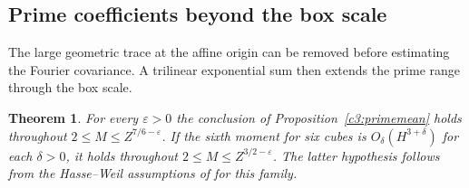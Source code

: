 \documentclass[11pt,letterpaper]{article}
\newtheorem{theorem}{Theorem}[section]
\theoremstyle{definition}
\begin{document}
\subsection{Prime coefficients beyond the box scale}
The large geometric trace at the affine origin can be removed before
estimating the Fourier covariance. A trilinear exponential sum then
extends the prime range through the box scale.
\begin{theorem}\label{c3:longprimemean}
For every $\varepsilon>0$ the conclusion of
Proposition~\ref{c3:primemean} holds throughout
$2\le M\le Z^{7/6-\varepsilon}$. If the sixth moment for six
cubes is $O_\delta(H^{3+\delta})$ for each $\delta>0$, it holds
throughout $2\le M\le Z^{3/2-\varepsilon}$. The latter hypothesis
follows from the Hasse--Weil assumptions of
\cite[Theorem 1.4]{c3:wang} for this family.
\end{theorem}
\end{document}
